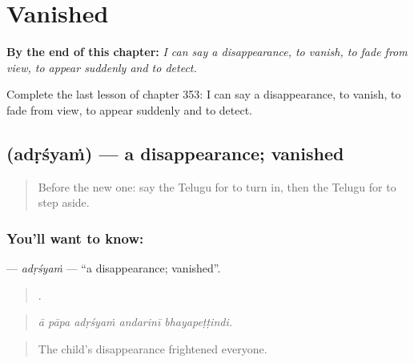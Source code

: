 
\chapter{Vanished}
\label{ch:te-vanished}

\begin{chapteropening}
\textbf{By the end of this chapter:} \emph{I can say a disappearance, to vanish, to fade from view, to appear suddenly and to detect.}

Complete the last lesson of chapter 353: I can say a disappearance, to vanish, to fade from view, to appear suddenly and to detect.
\end{chapteropening}

\section[\texorpdfstring{\te{అదృశ్యం} (adṛśyaṁ)}{అదృశ్యం (adṛśyaṁ)}]{ (adṛśyaṁ) — a disappearance; vanished}

\label{lesson:TE-C353-adrsyam}



\begin{quote}
Before the new one: say the Telugu for to turn in, then the Telugu for to step aside.
\end{quote}

\subsection*{You'll want to know: }
\textbf{} — \emph{adṛśyaṁ} — \textquotedblleft{}a disappearance; vanished\textquotedblright{}.

\begin{quote}
    .
\end{quote}

\begin{quote}
\emph{ā pāpa adṛśyaṁ andarinī bhayapeṭṭindi.}
\end{quote}

\begin{quote}
The child's disappearance frightened everyone.
\end{quote}

